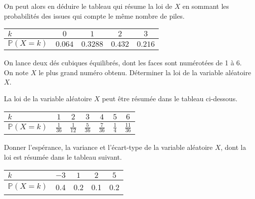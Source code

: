 \documentclass[11pt,fleqn, openany]{book} %
\begin{document}
\begin{solution}
On peut alors en déduire le tableau qui résume la loi de $X$ en sommant les probabilités des issues qui compte le même nombre de piles.

\begin{center}
\begin{tabular}{|l|c|c|c|c|}
\hline
$k$ & $0$ & $1$ & $2$  & $3$ \\
\hline
$\mathbb{P}(X=k)$ & $0.064$ & $0.3288$ & $0.432$ & $0.216$ \\
\hline \end{tabular}
\end{center}

\end{solution}






\begin{exercise}[topic=prob02]On lance deux dés cubiques équilibrés, dont les faces sont numérotées de 1 à 6. On note $X$ le plus grand numéro obtenu. Déterminer la loi de la variable aléatoire $X$.\newpage \end{exercise}

\begin{solution}La loi de la variable aléatoire $X$ peut être résumée dans le tableau ci-dessous.

\begin{center}
\begin{tabular}{|l|c|c|c|c|c|c|}
\hline
$k$ & $1$ & $2$ & $3$  & $4$ &$5$ & $6$ \\
\hline
$\mathbb{P}(X=k)$ & $\frac{1}{36}$ & $\frac{1}{12}$ & $\frac{5}{36}$ & $\frac{7}{36}$ & $\frac{1}{4}$ & $\frac{11}{36}$ \\
\hline \end{tabular}
\end{center}
\end{solution}




\begin{exercise}[topic=prob02]Donner l'espérance, la variance et l'écart-type de la variable aléatoire $X$, dont la loi est résumée dans le tableau suivant.
\begin{center}
\begin{tabular}{|l|c|c|c|c|}
\hline
$k$ & $-3$ & $1$ & $2$ & $5$ \\
\hline
$\mathbb{P}(X=k)$ & 0.4 & 0.2 & 0.1 & 0.2 \\
\hline \end{tabular}
\end{center} \end{exercise}
\end{document}

